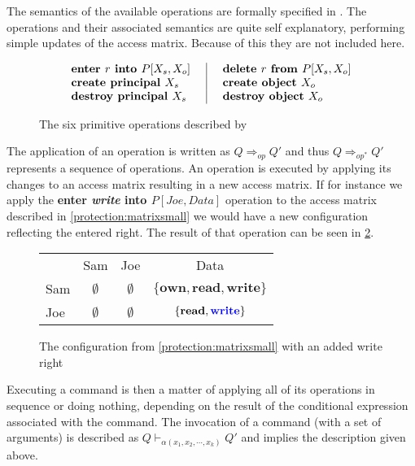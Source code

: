The semantics of the available operations are formally specified in \citet[p. 463]{HRU}.
The operations and their associated semantics are quite self explanatory, performing simple updates of the access matrix.
Because of this they are not included here.

\begin{figure}
 \centering
 \[\arraycolsep=14pt%
 \begin{array}{l|l}
  \textbf{enter } r \textbf{ into } P[X_s, X_o] & \textbf{delete } r \textbf{ from } P[X_s, X_o]\\
  \textbf{create \ssubject{} } X_s & \textbf{create object } X_o\\
  \textbf{destroy \ssubject{} } X_s & \textbf{destroy object } X_o
 \end{array}
 \]
 \caption{The six primitive operations described by \cite{HRU}}
 \label{protection:operations}
\end{figure}

The application of an operation is written as $Q \Rightarrow_{op} Q'$ and thus $Q \Rightarrow_{op^*} Q'$ represents a sequence of operations.
An operation is executed by applying its changes to an access matrix resulting in a new access matrix.
If for instance we apply the \textbf{enter \textit{write} into $P[Joe, Data]$} operation to the access matrix described in \cref{protection:matrixsmall} we would have a new configuration reflecting the entered right.
The result of that operation can be seen in \cref{protection:matrixwithwrite}.

\begin{figure}
\centering
\begin{tabular}{l|c|c|c|}
\multicolumn{1}{c}{} & \multicolumn{1}{c}{Sam} & \multicolumn{1}{c}{Joe} & \multicolumn{1}{c}{Data} \\\cline{2-4}
Sam & $\emptyset$ & $\emptyset$ & $\{\textbf{own}, \textbf{read}, \textbf{write}\}$ \\\cline{2-4}
Joe & $\emptyset$ & $\emptyset$ & $\{\textbf{read}, {\color{blue}\textbf{write}}\}$ \\\cline{2-4}
\end{tabular}
\caption{The configuration from \cref{protection:matrixsmall} with an added write right}
\label{protection:matrixwithwrite}
\end{figure}

Executing a command is then a matter of applying all of its operations in sequence or doing nothing, depending on the result of the conditional expression associated with the command.
The invocation of a command (with a set of arguments) is described as $Q \vdash_{\alpha(x_1, x_2, \cdots, x_k)} Q'$ and implies the description given above.

